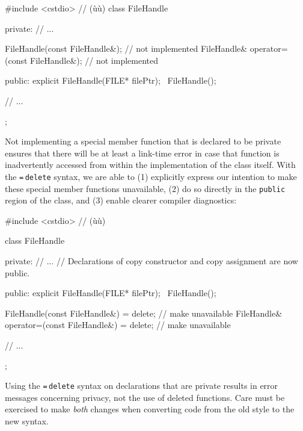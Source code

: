 \begin{emcppslisting}
#include <cstdio>  // (ù{}ù)
class FileHandle
{
private:
    // ...

    FileHandle(const FileHandle&);             // not implemented
    FileHandle& operator=(const FileHandle&);  // not implemented

public:
    explicit FileHandle(FILE* filePtr);
    ~FileHandle();

    // ...
};
\end{emcppslisting}

\noindent Not implementing a special member function that is declared to be private ensures that there will be at least a link-time error in case that function is inadvertently accessed from within the implementation of the class itself. With the \lstinline!=!\,\lstinline!delete! syntax, we are able to (1)
explicitly express our intention to make these special member
functions unavailable, (2) do so directly in the \lstinline!public! region
of the class, and (3) enable clearer compiler diagnostics:

%
%
%
\begin{emcppshiddenlisting}[emcppsbatch=e1]
#include <cstdio>  // (ù{}ù)
\end{emcppshiddenlisting}
\begin{emcppslisting}[emcppsbatch=e1]
class FileHandle
{
private:
    // ...
    // Declarations of copy constructor and copy assignment are now public.

public:
    explicit FileHandle(FILE* filePtr);
    ~FileHandle();

    FileHandle(const FileHandle&) = delete;             // make unavailable
    FileHandle& operator=(const FileHandle&) = delete;  // make unavailable

    // ...
};
\end{emcppslisting}

\noindent Using the \lstinline!=!\,\lstinline!delete! syntax on declarations that are private results in error messages concerning privacy, not the use of deleted functions. Care must be exercised to make \emph{both} changes when converting code from the old style to the new syntax.

